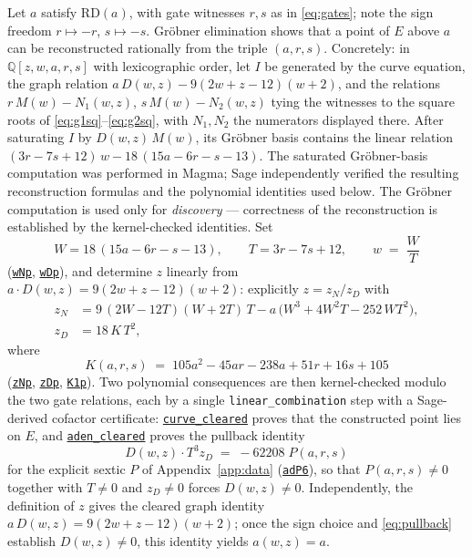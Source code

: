 \documentclass[11pt]{amsart}
\newcommand{\Q}{\mathbb{Q}}
\newcommand{\repourl}{https://github.com/hirokifukui/rd-quartics-classification}
\newcommand{\repotag}{v1.1.0}
\newcommand{\leanline}[3]{\href{\repourl/blob/\repotag/#1\#L#2}{\texttt{#3}}}
\begin{document}
Let $a$ satisfy $\mathrm{RD}(a)$, with gate witnesses $r, s$ as in
\eqref{eq:gates}; note the sign freedom $r \mapsto -r$, $s \mapsto -s$.
Gr\"obner elimination shows that a point of $E$ above $a$ can be
reconstructed rationally from the triple $(a,r,s)$.  Concretely: in
$\Q[z,w,a,r,s]$ with lexicographic order, let $I$ be generated by the
curve equation, the graph relation $a\,D(w,z) - 9(2w+z-12)(w+2)$, and
the relations $r\,M(w) - N_1(w,z)$, $s\,M(w) - N_2(w,z)$ tying the
witnesses to the square roots of \eqref{eq:g1sq}--\eqref{eq:g2sq},
with $N_1, N_2$ the numerators displayed there.  After saturating $I$
by $D(w,z)\,M(w)$, its Gr\"obner basis contains the linear relation
$(3r-7s+12)\,w - 18\,(15a-6r-s-13)$.  The saturated Gr\"obner-basis
computation was performed in Magma; Sage independently verified the
resulting reconstruction formulas and the polynomial identities used
below.  The Gr\"obner computation is used only for \emph{discovery} ---
correctness of the reconstruction is established by the kernel-checked
identities.  Set
\begin{equation}\label{eq:winv}
W = 18\,(15a - 6r - s - 13), \qquad T = 3r - 7s + 12, \qquad
w \;=\; \frac{W}{T}
\end{equation}
(\leanline{Thm7Prime/Master.lean}{371}{wNp},
\leanline{Thm7Prime/Master.lean}{374}{wDp}),
and determine $z$ linearly from $a \cdot D(w,z) = 9(2w+z-12)(w+2)$:
explicitly $z = z_N/z_D$ with
\begin{equation}\label{eq:zN}
\begin{aligned}
z_N &= 9\,(2W-12T)(W+2T)\,T - a\,\bigl(W^{3}+4W^{2}T-252\,WT^{2}\bigr),\\
z_D &= 18\,K\,T^{2},
\end{aligned}
\end{equation}
where
\begin{equation}\label{eq:K}
K(a,r,s) \;=\; 105a^{2}-45ar-238a+51r+16s+105
\end{equation}
(\leanline{Thm7Prime/Master.lean}{382}{zNp},
\leanline{Thm7Prime/Master.lean}{387}{zDp},
\leanline{Thm7Prime/Master.lean}{378}{K1p}).  Two polynomial
consequences are then kernel-checked modulo the two gate relations,
each by a single \texttt{linear\_combination} step with a Sage-derived
cofactor certificate:
\leanline{Thm7Prime/Master.lean}{511}{curve\_cleared} proves that the
constructed point lies on $E$, and
\leanline{Thm7Prime/Master.lean}{525}{aden\_cleared} proves the
pullback identity
\begin{equation}\label{eq:pullback}
D(w,z)\cdot T^{3} z_D \;=\; -62208\; P(a,r,s)
\end{equation}
for the explicit sextic $P$ of Appendix~\ref{app:data}
(\leanline{Thm7Prime/Master.lean}{392}{adP6}), so that
$P(a,r,s) \neq 0$ together with $T \neq 0$ and $z_D \neq 0$ forces
$D(w,z) \neq 0$.  Independently, the definition of $z$ gives the
cleared graph identity $a\,D(w,z) = 9(2w+z-12)(w+2)$; once the sign
choice and \eqref{eq:pullback} establish $D(w,z) \neq 0$, this identity
yields $a(w,z) = a$.
\end{document}
